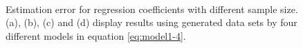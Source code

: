\documentclass[twoside,11pt]{article}
\begin{document}
\begin{figure}[h]
	\\
	\caption{Estimation error for regression coefficients with different sample size. (a), (b), (c) and (d) display results using generated data sets by four different models in equation \eqref{eq:model1-4}.}
	\label{fig:esterr}
\end{figure}
\end{document}
